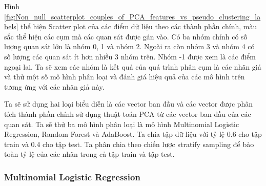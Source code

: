 Hình \ref{fig:Non_null_scatterplot_couples_of_PCA_features_vs_pseudo_clustering_labels} thể hiện Scatter plot của các điểm dữ liệu theo các thành phần chính, màu sắc thể hiện các cụm mà các quan sát được gán vào.
Có ba nhóm chính có số lượng quan sát lớn là nhóm 0, 1 và nhóm 2.
Ngoài ra còn nhóm 3 và nhóm 4 có số lượng các quan sát ít hơn nhiều 3 nhóm trên.
Nhóm -1 được xem là các điểm ngoại lai.
Ta sẽ xem các nhóm là kết quả của quá trình phân cụm là các nhãn giả và thử một số mô hình phân loại và đánh giá hiệu quả của các mô hình trên tương ứng với các nhãn giả này.

Ta sẽ sử dụng hai loại biểu diễn là các vector ban đầu và các vector được phân tích thành phần chính sử dụng thuật toán PCA từ các vector ban đầu của các quan sát.
Ta sẽ thử ba mô hình phân loại là mô hình Multinomial Logistic Regression, Random Forest và AdaBoost.
Ta chia tập dữ liệu với tỷ lệ 0.6 cho tập train và 0.4 cho tập test.
Ta phân chia theo chiến lược stratify sampling để bảo toàn tỷ lệ của các nhãn trong cả tập train và tập test.


\subsubsection{Multinomial Logistic Regression}